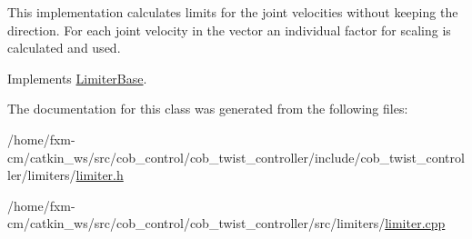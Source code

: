 This implementation calculates limits for the joint velocities without keeping the direction. For each joint velocity in the vector an individual factor for scaling is calculated and used. 

Implements \hyperlink{classLimiterBase_a1755edebc0cacfd79f945852ead8ae04}{Limiter\-Base}.



The documentation for this class was generated from the following files\-:\begin{DoxyCompactItemize}
\item 
/home/fxm-\/cm/catkin\-\_\-ws/src/cob\-\_\-control/cob\-\_\-twist\-\_\-controller/include/cob\-\_\-twist\-\_\-controller/limiters/\hyperlink{limiter_8h}{limiter.\-h}\item 
/home/fxm-\/cm/catkin\-\_\-ws/src/cob\-\_\-control/cob\-\_\-twist\-\_\-controller/src/limiters/\hyperlink{limiter_8cpp}{limiter.\-cpp}\end{DoxyCompactItemize}
